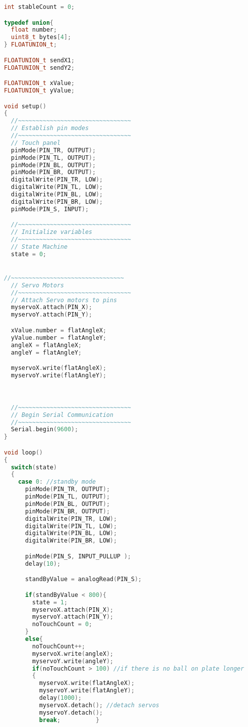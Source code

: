 \begin{lstlisting}[language=C++ , caption= Arduino full code for controlling the system by a simulink controller]
int stableCount = 0;

typedef union{
  float number;
  uint8_t bytes[4];
} FLOATUNION_t;

FLOATUNION_t sendX1;
FLOATUNION_t sendY2;

FLOATUNION_t xValue;
FLOATUNION_t yValue;

void setup()
{ 
  //~~~~~~~~~~~~~~~~~~~~~~~~~~~~~~~~
  // Establish pin modes
  //~~~~~~~~~~~~~~~~~~~~~~~~~~~~~~~~
  // Touch panel
  pinMode(PIN_TR, OUTPUT);
  pinMode(PIN_TL, OUTPUT);
  pinMode(PIN_BL, OUTPUT);
  pinMode(PIN_BR, OUTPUT);
  digitalWrite(PIN_TR, LOW);
  digitalWrite(PIN_TL, LOW);
  digitalWrite(PIN_BL, LOW);
  digitalWrite(PIN_BR, LOW);
  pinMode(PIN_S, INPUT);

  //~~~~~~~~~~~~~~~~~~~~~~~~~~~~~~~~
  // Initialize variables
  //~~~~~~~~~~~~~~~~~~~~~~~~~~~~~~~~
  // State Machine
  state = 0;


//~~~~~~~~~~~~~~~~~~~~~~~~~~~~~~~~
  // Servo Motors
  //~~~~~~~~~~~~~~~~~~~~~~~~~~~~~~~~
  // Attach Servo motors to pins
  myservoX.attach(PIN_X);
  myservoY.attach(PIN_Y);

  xValue.number = flatAngleX;
  yValue.number = flatAngleY;
  angleX = flatAngleX;
  angleY = flatAngleY;

  myservoX.write(flatAngleX);
  myservoY.write(flatAngleY);



  //~~~~~~~~~~~~~~~~~~~~~~~~~~~~~~~~
  // Begin Serial Communication
  //~~~~~~~~~~~~~~~~~~~~~~~~~~~~~~~~
  Serial.begin(9600);
}

void loop()
{
  switch(state)
  {
    case 0: //standby mode
      pinMode(PIN_TR, OUTPUT);
      pinMode(PIN_TL, OUTPUT);
      pinMode(PIN_BL, OUTPUT);
      pinMode(PIN_BR, OUTPUT);
      digitalWrite(PIN_TR, LOW);
      digitalWrite(PIN_TL, LOW);
      digitalWrite(PIN_BL, LOW);
      digitalWrite(PIN_BR, LOW);

      pinMode(PIN_S, INPUT_PULLUP );
      delay(10);

      standByValue = analogRead(PIN_S);

      if(standByValue < 800){
        state = 1;
        myservoX.attach(PIN_X);
        myservoY.attach(PIN_Y);
        noTouchCount = 0; 
      }
      else{
        noTouchCount++;
        myservoX.write(angleX); 
        myservoY.write(angleY); 
        if(noTouchCount > 100) //if there is no ball on plate longer
        {
          myservoX.write(flatAngleX); 
          myservoY.write(flatAngleY); 
          delay(1000);   
          myservoX.detach(); //detach servos
          myservoY.detach();   
          break;          }


\end{lstlisting}
